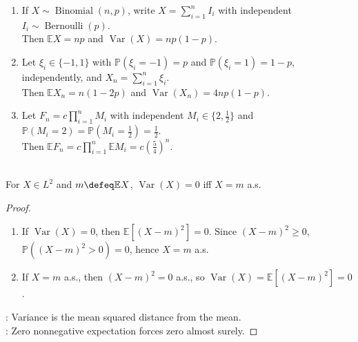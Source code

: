 \begin{example} \label{ex:indicator-sums-binomial-random-walk-game} 
\begin{enumerate}[label=(\roman*)]
\setlength{\itemsep}{0pt}
\item If $X\sim\operatorname{Binomial}(n,p)$, write $X=\sum\limits_{i=1}^{n}I_i$ with independent $I_i\sim\operatorname{Bernoulli}(p)$.\\
Then $\mathbb{E}X=np$ and $\operatorname{Var}(X)=np(1-p)$.
\item Let $\xi_i\in\{-1,1\}$ with $\mathbb{P}(\xi_i=-1)=p$ and $\mathbb{P}(\xi_i=1)=1-p$, independently, and $X_n=\sum\limits_{i=1}^{n}\xi_i$.\\
Then $\mathbb{E}X_n=n(1-2p)$ and $\operatorname{Var}(X_n)=4np(1-p)$.
\item Let $F_n=c\prod\limits_{i=1}^{n}M_i$ with independent $M_i\in\{2,\frac{1}{2}\}$ and $\mathbb{P}(M_i=2)=\mathbb{P}(M_i=\frac{1}{2})=\frac{1}{2}$.\\
Then $\mathbb{E}F_n=c\prod\limits_{i=1}^{n}\mathbb{E}M_i=c(\frac{5}{4})^n$.
\end{enumerate}
\end{example}

\begin{proposition} \label{prop:variance-zero-iff-constant} \\
For $X\in L^2$ and $m\defeq\mathbb{E}X$, $\operatorname{Var}(X)=0$ iff $X=m$ a.s.
\begin{proof}
\begin{enumerate}[label=\roman*.]
\setlength{\itemsep}{0pt}
\item[$(\Rightarrow)$] If $\operatorname{Var}(X)=0$, then $\mathbb{E}[(X-m)^2]=0$. Since $(X-m)^2\geq0$, $\mathbb{P}((X-m)^2>0)=0$, hence $X=m$ a.s.
\item[$(\Leftarrow)$] If $X=m$ a.s., then $(X-m)^2=0$ a.s., so $\operatorname{Var}(X)=\mathbb{E}[(X-m)^2]=0$.
\end{enumerate}
: Variance is the mean squared distance from the mean.\\
: Zero nonnegative expectation forces zero almost surely.
\end{proof}
\end{proposition}

